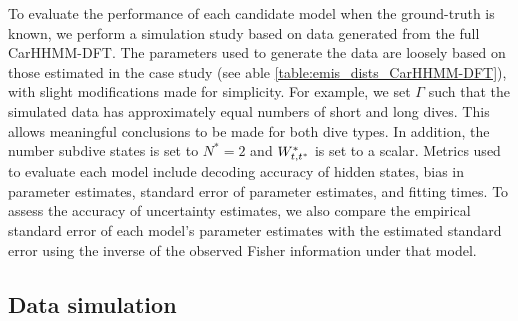 

To evaluate the performance of each candidate model when the ground-truth is known, we perform a simulation study based on data generated from the full CarHHMM-DFT. The parameters used to generate the data are loosely based on those estimated in the case study (see able \ref{table:emis_dists_CarHHMM-DFT}), with slight modifications made for simplicity. For example, we set $\Gamma$ such that the simulated data has approximately equal numbers of short and long dives. This allows meaningful conclusions to be made for both dive types. In addition, the number subdive states is set to $N^*=2$ and $W^*_{t,t^*}$ is set to a scalar. Metrics used to evaluate each model include decoding accuracy of hidden states, bias in parameter estimates, standard error of parameter estimates, and fitting times. To assess the accuracy of uncertainty estimates, we also compare the empirical standard error of each model's parameter estimates with the estimated standard error using the inverse of the observed Fisher information under that model.

\subsection{Data simulation}

